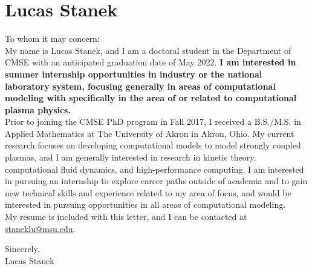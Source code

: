 \section{Lucas Stanek} %
\label{sec:lucas_stanek} %

\setlength\parindent{0cm}

To whom it may concern:\\

My name is Lucas Stanek, and I am a doctoral student in the Department of CMSE with an anticipated graduation date of May 2022. {\textbf{I am interested in summer internship opportunities in industry or the national laboratory system, focusing generally in areas of computational modeling with specifically in the area of or related to computational plasma physics.}} \\

Prior to joining the CMSE PhD program in Fall 2017, I received a B.S./M.S. in Applied Mathematics at The University of Akron in Akron, Ohio. My current research focuses on developing computational models to model strongly coupled plasmas, and I am generally interested in research in kinetic theory, computational fluid dynamics, and high-performance computing. I am interested in pursuing an internship to explore career paths outside of academia and to gain new technical skills and experience related to my area of focus, and would be interested in pursuing opportunities in all areas of computational modeling.\\

My resume is included with this letter, and I can be contacted at \href{mailto:staneklu@msu.edu}{staneklu@msu.edu}.\\

\begin{flushright}
Sincerely, \\
\vspace{1em} 
\vspace{1em} 
Lucas Stanek\\
\end{flushright}

